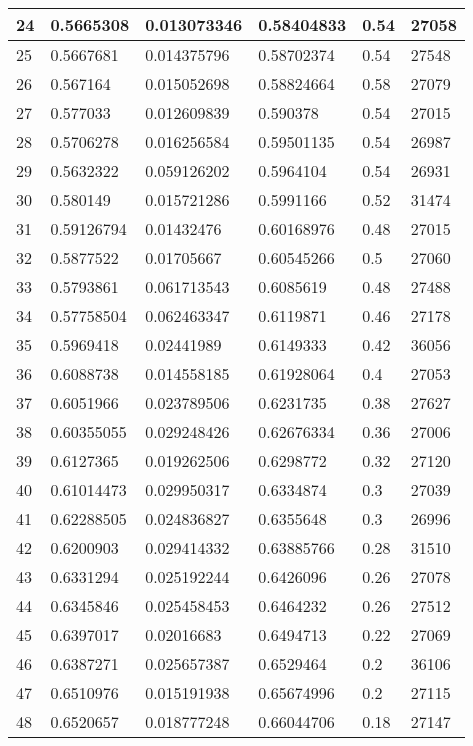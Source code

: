 \begin{longtable}{|l|l|l|l|l|l|}
24 & 0.5665308 & 0.013073346 & 0.58404833 & 0.54 & 27058 \\ \hline 
25 & 0.5667681 & 0.014375796 & 0.58702374 & 0.54 & 27548 \\ \hline 
26 & 0.567164 & 0.015052698 & 0.58824664 & 0.58 & 27079 \\ \hline 
27 & 0.577033 & 0.012609839 & 0.590378 & 0.54 & 27015 \\ \hline 
28 & 0.5706278 & 0.016256584 & 0.59501135 & 0.54 & 26987 \\ \hline 
29 & 0.5632322 & 0.059126202 & 0.5964104 & 0.54 & 26931 \\ \hline 
30 & 0.580149 & 0.015721286 & 0.5991166 & 0.52 & 31474 \\ \hline 
31 & 0.59126794 & 0.01432476 & 0.60168976 & 0.48 & 27015 \\ \hline 
32 & 0.5877522 & 0.01705667 & 0.60545266 & 0.5 & 27060 \\ \hline 
33 & 0.5793861 & 0.061713543 & 0.6085619 & 0.48 & 27488 \\ \hline 
34 & 0.57758504 & 0.062463347 & 0.6119871 & 0.46 & 27178 \\ \hline 
35 & 0.5969418 & 0.02441989 & 0.6149333 & 0.42 & 36056 \\ \hline 
36 & 0.6088738 & 0.014558185 & 0.61928064 & 0.4 & 27053 \\ \hline 
37 & 0.6051966 & 0.023789506 & 0.6231735 & 0.38 & 27627 \\ \hline 
38 & 0.60355055 & 0.029248426 & 0.62676334 & 0.36 & 27006 \\ \hline 
39 & 0.6127365 & 0.019262506 & 0.6298772 & 0.32 & 27120 \\ \hline 
40 & 0.61014473 & 0.029950317 & 0.6334874 & 0.3 & 27039 \\ \hline 
41 & 0.62288505 & 0.024836827 & 0.6355648 & 0.3 & 26996 \\ \hline 
42 & 0.6200903 & 0.029414332 & 0.63885766 & 0.28 & 31510 \\ \hline 
43 & 0.6331294 & 0.025192244 & 0.6426096 & 0.26 & 27078 \\ \hline 
44 & 0.6345846 & 0.025458453 & 0.6464232 & 0.26 & 27512 \\ \hline 
45 & 0.6397017 & 0.02016683 & 0.6494713 & 0.22 & 27069 \\ \hline 
46 & 0.6387271 & 0.025657387 & 0.6529464 & 0.2 & 36106 \\ \hline 
47 & 0.6510976 & 0.015191938 & 0.65674996 & 0.2 & 27115 \\ \hline 
48 & 0.6520657 & 0.018777248 & 0.66044706 & 0.18 & 27147 \\ \hline 

\end{longtable}
